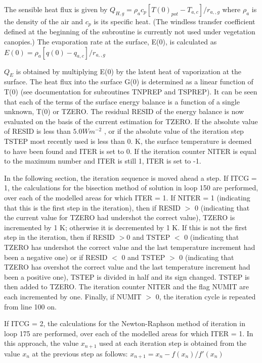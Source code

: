 The sensible heat flux is given by $Q_{H,g} = \rho_a c_p [T(0)_{pot} - T_{a,c} ]/r_{a,,g}$ where $\rho_a$ is the density of the air and $c_p$ is its specific heat. (The windless transfer coefficient defined at the beginning of the subroutine is currently not used under vegetation canopies.) The evaporation rate at the surface, E(0), is calculated as $E(0) = \rho_a [q(0) - q_{a,c} ]/r_{a,,g}$

$Q_E$ is obtained by multiplying E(0) by the latent heat of vaporization at the surface. The heat flux into the surface G(0) is determined as a linear function of T(0) (see documentation for subroutines T\+N\+P\+R\+E\+P and T\+S\+P\+R\+E\+P). It can be seen that each of the terms of the surface energy balance is a function of a single unknown, T(0) or T\+Z\+E\+R\+O. The residual R\+E\+S\+I\+D of the energy balance is now evaluated on the basis of the current estimation for T\+Z\+E\+R\+O. If the absolute value of R\+E\+S\+I\+D is less than $5.0 W m^{-2}$ , or if the absolute value of the iteration step T\+S\+T\+E\+P most recently used is less than 0. K, the surface temperature is deemed to have been found and I\+T\+E\+R is set to 0. If the iteration counter N\+I\+T\+E\+R is equal to the maximum number and I\+T\+E\+R is still 1, I\+T\+E\+R is set to -\/1.

In the following section, the iteration sequence is moved ahead a step. If I\+T\+C\+G = 1, the calculations for the bisection method of solution in loop 150 are performed, over each of the modelled areas for which I\+T\+E\+R = 1. If N\+I\+T\+E\+R = 1 (indicating that this is the first step in the iteration), then if R\+E\+S\+I\+D $>$ 0 (indicating that the current value for T\+Z\+E\+R\+O had undershot the correct value), T\+Z\+E\+R\+O is incremented by 1 K; otherwise it is decremented by 1 K. If this is not the first step in the iteration, then if R\+E\+S\+I\+D $>$0 and T\+S\+T\+E\+P $<$ 0 (indicating that T\+Z\+E\+R\+O has undershot the correct value and the last temperature increment had been a negative one) or if R\+E\+S\+I\+D $<$ 0 and T\+S\+T\+E\+P $>$ 0 (indicating that T\+Z\+E\+R\+O has overshot the correct value and the last temperature increment had been a positive one), T\+S\+T\+E\+P is divided in half and its sign changed. T\+S\+T\+E\+P is then added to T\+Z\+E\+R\+O. The iteration counter N\+I\+T\+E\+R and the flag N\+U\+M\+I\+T are each incremented by one. Finally, if N\+U\+M\+I\+T $>$ 0, the iteration cycle is repeated from line 100 on.

If I\+T\+C\+G = 2, the calculations for the Newton-\/\+Raphson method of iteration in loop 175 are performed, over each of the modelled areas for which I\+T\+E\+R = 1. In this approach, the value $x_{n+1}$ used at each iteration step is obtained from the value $x_n$ at the previous step as follows\+: $x_{n+1} = x_n - f(x_n )/f'(x_n )$

